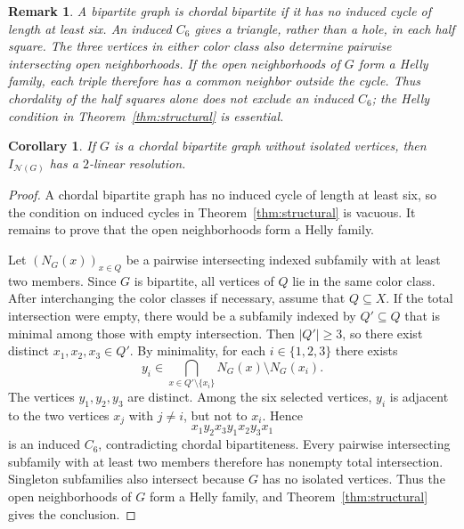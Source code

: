 \documentclass[10pt,a4paper]{amsart}
\newtheorem{corollary}[theorem]{Corollary}
\newtheorem{remark}[theorem]{Remark}
\numberwithin{equation}{section}
\newcommand{\NN}{\mathcal N}
\begin{document}
	\begin{remark}
		A bipartite graph is \emph{chordal bipartite} if it has no induced cycle of
		length at least six. An induced \(C_6\) gives a triangle, rather than a
		hole, in each half square. The three vertices in either color class also
		determine pairwise intersecting open neighborhoods. If the open
		neighborhoods of \(G\) form a Helly family, each triple therefore
		has a common neighbor outside
		the cycle. Thus chordality of the half squares alone does not exclude an induced
		\(C_6\); the Helly condition in Theorem~\ref{thm:structural} is essential.
	\end{remark}
	
	\begin{corollary}\label{cor:chordal-bipartite}
		If \(G\) is a chordal bipartite graph without isolated vertices, then
		\(I_{\NN(G)}\) has a \(2\)-linear resolution.
	\end{corollary}
	
	\begin{proof}
		A chordal bipartite graph has no induced cycle of length at least six, so the
		condition on induced cycles in Theorem~\ref{thm:structural} is vacuous. It
		remains to prove that the open neighborhoods form a Helly family.
		
		Let \((N_G(x))_{x\in Q}\) be a pairwise intersecting indexed subfamily with at
		least two members. Since \(G\) is bipartite, all vertices of \(Q\) lie in the
		same color class. After interchanging the color classes if necessary, assume
		that \(Q\subseteq X\). If the total intersection were empty, there would be a subfamily indexed by
		\(Q'\subseteq Q\) that is minimal among those with empty intersection. Then
		\(|Q'|\ge3\), so there exist distinct \(x_1,x_2,x_3\in Q'\). By minimality, for each \(i\in\{1,2,3\}\) there
		exists
		\[
		y_i\in
		\bigcap_{x\in Q'\setminus\{x_i\}}N_G(x)
		\setminus N_G(x_i).
		\]
		The vertices \(y_1,y_2,y_3\) are distinct. Among the six selected vertices,
		\(y_i\) is adjacent to the two vertices \(x_j\) with \(j\ne i\), but not to
		\(x_i\). Hence
		\[
		x_1y_2x_3y_1x_2y_3x_1
		\]
		is an induced \(C_6\), contradicting chordal bipartiteness. Every pairwise
		intersecting subfamily with at least two members therefore has nonempty total
		intersection. Singleton subfamilies also intersect because \(G\) has no
		isolated vertices. Thus the open neighborhoods of \(G\) form a Helly family, and
		Theorem~\ref{thm:structural} gives the conclusion.
	\end{proof}
	
\end{document}
